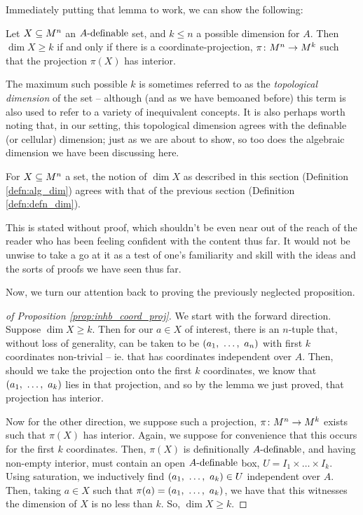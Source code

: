 Immediately putting that lemma to work, we can show the following:
\begin{proposition}
  Let $\XMn[X]{n}$ an $\Adefnb$ set, and $k \leq n$ a possible dimension for $A$. Then $\dim{X} \geq k$ if and only if there is a coordinate-projection, $\funcdom{\pi}{M^n}{M^k}$ such that the projection $\pi(X)$ has \inhb interior.
  \label{prop:inhb_coord_proj}
\end{proposition}

\begin{remark}
  The maximum such possible $k$ is sometimes referred to as the \emph{topological dimension} of the set -- although (and as we have bemoaned before) this term is also used to refer to a variety of inequivalent concepts. It is also perhaps worth noting that, in our setting, this topological dimension agrees with the definable (or cellular) dimension; just as we are about to show, so too does the algebraic dimension we have been discussing here.
\end{remark}

\begin{corollary}
  For $\XMn[X]{n}$ a  set, the notion of $\dim{X}$ as described in this section (Definition \ref{defn:alg_dim}) agrees with that of the previous section (Definition \ref{defn:defn_dim}).
  \label{cor:dim_agree}
\end{corollary}
This is stated without proof, which shouldn't be even near out of the reach of the reader who has been feeling confident with the content thus far. It would not be unwise to take a go at it as a test of one's familiarity and skill with the ideas and the sorts of proofs we have seen thus far.

Now, we turn our attention back to proving the previously neglected proposition.
\begin{proof}[of Proposition \ref{prop:inhb_coord_proj}]
  We start with the forward direction. Suppose $\dim{X} \geq k$. Then for our $a \in X$ of interest, there is an $n$-tuple that, without loss of generality, can be taken to be $(\vonevm{a}{n})$ with first $k$ coordinates non-trivial -- ie. that has coordinates independent over $A$. Then, should we take the projection onto the first $k$ coordinates, we know that $(\vonevm{a}{k})$ lies in that projection, and so by the lemma we just proved, that projection has \inhb interior.

  Now for the other direction, we suppose such a projection, $\funcdom{\pi}{M^n}{M^k}$ exists such that $\pi(X)$ has \inhb interior. Again, we suppose for convenience that this occurs for the first $k$ coordinates. Then, $\pi(X)$ is definitionally $\Adefnb$, and having non-empty interior, must contain an open $\Adefnb$ box, $U = I_1 \times \hdots \times I_k$. Using saturation, we inductively find $(\vonevm{a}{k}) \in U$ independent over $A$. Then, taking $a \in X$ such that $\pi(a) = (\vonevm{a}{k})$, we have that this witnesses the dimension of $X$ is no less than $k$. So, $\dim{X} \geq k$.
\end{proof}



